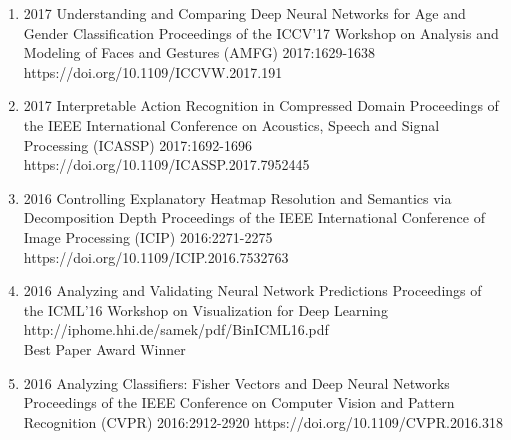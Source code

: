 {\begin{enumerate}
        \item {}
                                {2017}
                                {Understanding and Comparing Deep Neural Networks for Age and Gender Classification}
                                {Proceedings of the ICCV'17 Workshop on Analysis and Modeling of Faces and Gestures (AMFG)}
                                {2017:1629-1638}
                                {https://doi.org/10.1109/ICCVW.2017.191}

        \item {}
                                {2017}
                                {Interpretable Action Recognition in Compressed Domain}
                                {Proceedings of the IEEE International Conference on Acoustics, Speech and Signal Processing (ICASSP)}
                                {2017:1692-1696}
                                {https://doi.org/10.1109/ICASSP.2017.7952445}


        \item {}
                                {2016}
                                {Controlling Explanatory Heatmap Resolution and Semantics via Decomposition Depth}
                                {Proceedings of the IEEE International Conference of Image Processing (ICIP)}
                                {2016:2271-2275}
                                {https://doi.org/10.1109/ICIP.2016.7532763}


        \item {}
                                {2016}
                                {Analyzing and Validating Neural Network Predictions}
                                {Proceedings of the ICML'16 Workshop on Visualization for Deep Learning}
                                {}
                                {http://iphome.hhi.de/samek/pdf/BinICML16.pdf}
                                {\\Best Paper Award Winner}

        \item {}
                                {2016}
                                {Analyzing Classifiers: Fisher Vectors and Deep Neural Networks}
                                {Proceedings of the IEEE Conference on Computer Vision and Pattern Recognition (CVPR)}
                                {2016:2912-2920}
                                {https://doi.org/10.1109/CVPR.2016.318}


\end{enumerate}}
